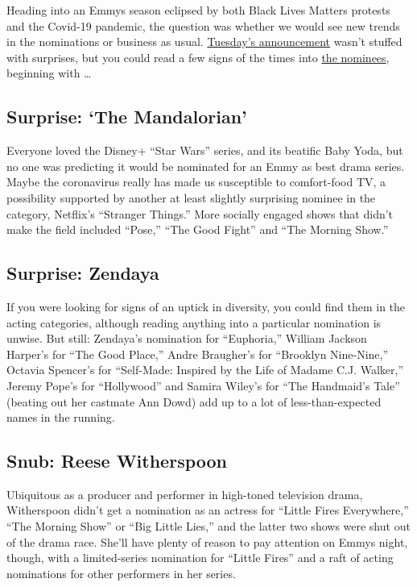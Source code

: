 Heading into an Emmys season eclipsed by both Black Lives Matters
protests and the Covid-19 pandemic, the question was whether we would
see new trends in the nominations or business as usual.
\href{https://www.nytimes.com/2020/07/28/arts/television/emmy-nominations.html}{Tuesday's
announcement} wasn't stuffed with surprises, but you could read a few
signs of the times into
\href{https://www.nytimes.com/2020/07/28/arts/television/emmy-nominees-list.html}{the
nominees}, beginning with \ldots{}

\hypertarget{surprise-the-mandalorian}{%
\subsection{Surprise: `The
Mandalorian'}\label{surprise-the-mandalorian}}

Everyone loved the Disney+ ``Star Wars'' series, and its beatific Baby
Yoda, but no one was predicting it would be nominated for an Emmy as
best drama series. Maybe the coronavirus really has made us susceptible
to comfort-food TV, a possibility supported by another at least slightly
surprising nominee in the category, Netflix's ``Stranger Things.'' More
socially engaged shows that didn't make the field included ``Pose,''
``The Good Fight'' and ``The Morning Show.''

\hypertarget{surprise-zendaya}{%
\subsection{Surprise: Zendaya}\label{surprise-zendaya}}

If you were looking for signs of an uptick in diversity, you could find
them in the acting categories, although reading anything into a
particular nomination is unwise. But still: Zendaya's nomination for
``Euphoria,'' William Jackson Harper's for ``The Good Place,'' Andre
Braugher's for ``Brooklyn Nine-Nine,'' Octavia Spencer's for
``Self-Made: Inspired by the Life of Madame C.J. Walker,'' Jeremy Pope's
for ``Hollywood'' and Samira Wiley's for ``The Handmaid's Tale''
(beating out her castmate Ann Dowd) add up to a lot of
less-than-expected names in the running.

\hypertarget{snub-reese-witherspoon}{%
\subsection{Snub: Reese Witherspoon}\label{snub-reese-witherspoon}}

Ubiquitous as a producer and performer in high-toned television drama,
Witherspoon didn't get a nomination as an actress for ``Little Fires
Everywhere,'' ``The Morning Show'' or ``Big Little Lies,'' and the
latter two shows were shut out of the drama race. She'll have plenty of
reason to pay attention on Emmys night, though, with a limited-series
nomination for ``Little Fires'' and a raft of acting nominations for
other performers in her series.

